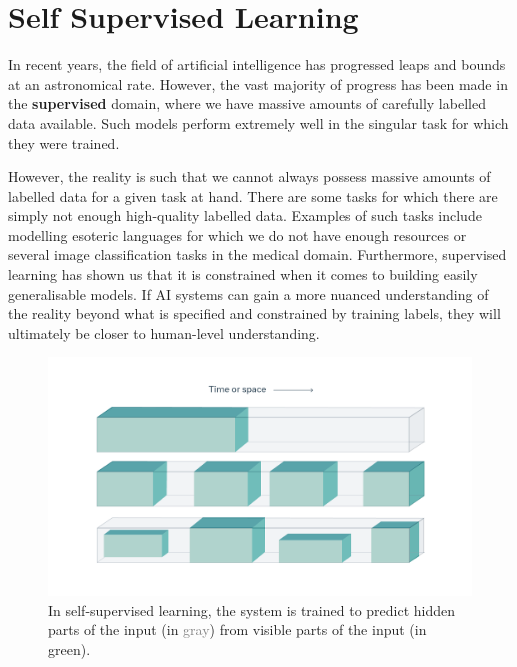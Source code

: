 \chapter{Self Supervised Learning} \label{chap:self-supervised-learning}

In recent years, the field of artificial intelligence has progressed leaps and bounds at an astronomical rate. 
However, the vast majority of progress has been made in the \textbf{supervised} domain, where we have massive amounts of carefully labelled data available. Such models perform extremely well in the singular task for which they were trained.

However, the reality is such that we cannot always possess massive amounts of labelled data for a given task at hand.
There are some tasks for which there are simply not enough high-quality labelled data. Examples of such tasks include modelling esoteric languages for which we do not have enough resources or several image classification tasks in the medical domain.
Furthermore, supervised learning has shown us that it is constrained when it comes to building easily generalisable models.
If AI systems can gain a more nuanced understanding of the reality beyond what is specified and constrained by training labels, they will ultimately be closer to human-level understanding.
\begin{figure}[th]
    \centering
    \includegraphics[width=\linewidth]{chapters/assets/ssl_figs/ssl.png}
    \caption{In self-supervised learning, the system is trained to predict hidden parts of the input (in \textcolor{gray}{gray}) from visible parts of the input (in \textcolor{tudelft-turquoise}{green}).}
    \label{fig:ssl-idea}
\end{figure}

